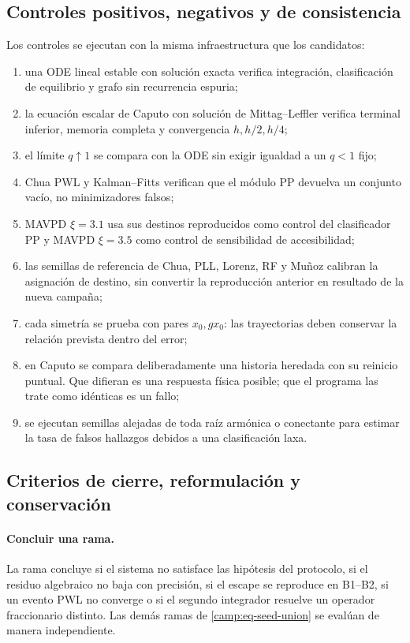 \subsection{Controles positivos, negativos y de consistencia}
\label{camp:controls}

Los controles se ejecutan con la misma infraestructura que los candidatos:

\begin{enumerate}
  \item una ODE lineal estable con solución exacta verifica integración,
        clasificación de equilibrio y grafo sin recurrencia espuria;
  \item la ecuación escalar de Caputo con solución de Mittag--Leffler verifica
        terminal inferior, memoria completa y convergencia \(h,h/2,h/4\);
  \item el límite \(q\uparrow1\) se compara con la ODE sin exigir igualdad a
        un \(q<1\) fijo;
  \item Chua PWL y Kalman--Fitts verifican que el módulo PP devuelva un conjunto
        vacío, no minimizadores falsos;
  \item MAVPD \(\xi=3.1\) usa sus destinos reproducidos como control del
        clasificador PP y MAVPD \(\xi=3.5\) como control de sensibilidad de
        accesibilidad;
  \item las semillas de referencia de Chua, PLL, Lorenz, RF y Muñoz calibran
        la asignación de destino, sin convertir la reproducción anterior en
        resultado de la nueva campaña;
  \item cada simetría se prueba con pares \(x_0,gx_0\): las trayectorias deben
        conservar la relación prevista dentro del error;
  \item en Caputo se compara deliberadamente una historia heredada con su
        reinicio puntual. Que difieran es una respuesta física posible; que el
        programa las trate como idénticas es un fallo;
  \item se ejecutan semillas alejadas de toda raíz armónica o conectante para
        estimar la tasa de falsos hallazgos debidos a una clasificación laxa.
\end{enumerate}

\subsection{Criterios de cierre, reformulación y conservación}
\label{camp:decision-rules}

\paragraph{Concluir una rama.}
La rama concluye si el sistema no satisface las hipótesis del protocolo, si el residuo algebraico no baja
con precisión, si el escape se reproduce en B1--B2, si un evento PWL no
converge o si el segundo integrador resuelve un operador fraccionario distinto.
Las demás ramas de \cref{camp:eq-seed-union} se evalúan de manera independiente.

